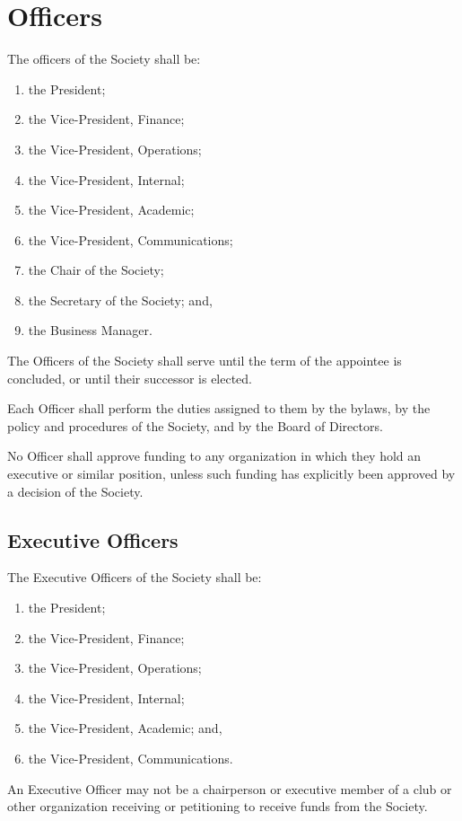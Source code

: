 \section{Officers}

The officers of the Society shall be:
\begin{enumerate}
    \item the President; 
    \item the Vice-President, Finance; 
    \item the Vice-President, Operations; 
    \item the Vice-President, Internal;
    \item the Vice-President, Academic;
    \item the Vice-President, Communications;
    \item the Chair of the Society;
    \item the Secretary of the Society; and,
    \item the Business Manager.
\end{enumerate}

The Officers of the Society shall serve until the term of the appointee is
concluded, or until their successor is elected. 

Each Officer shall perform the duties assigned to them by the bylaws, by the
policy and procedures of the Society, and by the Board of Directors.

No Officer shall approve funding to any organization in which they hold an
executive or similar position, unless such funding has explicitly been approved
by a decision of the Society.

\subsection{Executive Officers}
The Executive Officers of the Society shall be: \begin{enumerate}
    \item the President; 
    \item the Vice-President, Finance; 
    \item the Vice-President, Operations; 
    \item the Vice-President, Internal;
    \item the Vice-President, Academic; and,
    \item the Vice-President, Communications.
\end{enumerate}
An Executive Officer may not be a chairperson or executive member of a club or other 
organization receiving or petitioning to receive funds from the Society.

